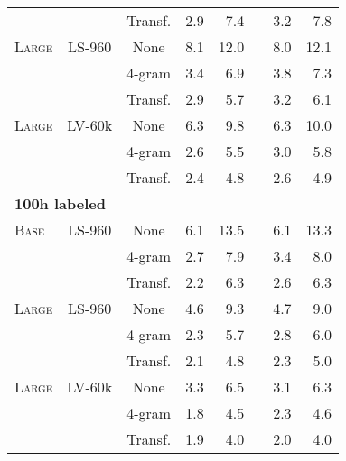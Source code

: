 \documentclass{article}
\newcommand{\wvppbase}{\textsc{Base}}
\newcommand{\wvppbig}{\textsc{Large}}
\newcommand{\voxsz}{LV-60k}
\newcommand{\librisz}{LS-960}
\begin{document}
\begin{table}[h]
\begin{tabular}{lcccrrrr}
&& Transf. & 2.9 & 7.4 && 3.2 & 7.8 \\
\wvppbig{} & \librisz{} & None & 8.1 & 12.0 && 8.0 & 12.1 \\
&& 4-gram & 3.4 & 6.9 && 3.8 & 7.3 \\
&& Transf. & 2.9 & 5.7 && 3.2 & 6.1 \\
\wvppbig{} & \voxsz{} & None & 6.3 & 9.8 && 6.3 & 10.0 \\
&& 4-gram & 2.6 & 5.5 && 3.0 & 5.8 \\
&& Transf. & 2.4 & 4.8 && 2.6 & 4.9 \\
\midrule
\midrule
\multicolumn{8}{l}{\textbf{100h labeled}}\\
\wvppbase{} & \librisz{} & None & 6.1 & 13.5 && 6.1 & 13.3 \\
&& 4-gram & 2.7 & 7.9 && 3.4 & 8.0 \\
&& Transf. & 2.2 & 6.3 && 2.6 & 6.3 \\
\wvppbig{} & \librisz{} & None & 4.6 & 9.3 && 4.7 & 9.0 \\
&& 4-gram & 2.3 & 5.7 && 2.8 & 6.0 \\
&& Transf. & 2.1 & 4.8 && 2.3 & 5.0 \\
\wvppbig{} & \voxsz{} & None & 3.3 & 6.5 && 3.1 & 6.3 \\
&& 4-gram & 1.8 & 4.5 && 2.3 & 4.6 \\
&& Transf. & 1.9 & 4.0 && 2.0 & 4.0 \\
\bottomrule
\end{tabular}
\end{table}
\end{document}
